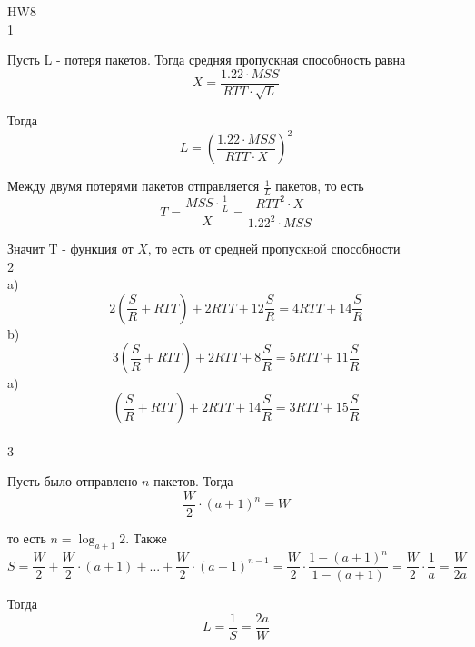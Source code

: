 \documentclass[a4paper,11pt]{article}
\begin{document}
\Large
HW8
\\
1

Пусть L - потеря пакетов. Тогда средняя пропускная способность равна
$$X = \frac{1.22 \cdot MSS}{RTT \cdot \sqrt{L}}$$

Тогда
$$L = (\frac{1.22 \cdot MSS}{RTT \cdot X})^2$$

Между двумя потерями пакетов отправляется $\frac{1}{L}$ пакетов, то есть 
$$T = \frac{MSS \cdot \frac{1}{L}}{X}  = \frac{RTT^2 \cdot X}{1.22^2 \cdot MSS}$$

Значит T - функция от $X$, то есть от средней пропускной способности
\\
2
\\
a) $$2(\frac{S}{R} + RTT) + 2RTT + 12\frac{S}{R} = 4RTT + 14\frac{S}{R}$$
b) $$3(\frac{S}{R} + RTT) + 2RTT + 8\frac{S}{R}  = 5RTT + 11\frac{S}{R}$$
a) $$(\frac{S}{R} + RTT) + 2RTT + 14\frac{S}{R} = 3RTT + 15\frac{S}{R}$$
\\
3

Пусть было отправлено $n$ пакетов. Тогда $$\frac{W}{2} \cdot (a + 1)^n = W$$ 

то есть $n = \log_{a + 1}2$. Также 
$$S = \frac{W}{2} + \frac{W}{2} \cdot (a + 1) + ... + \frac{W}{2} \cdot (a + 1)^{n - 1} = \frac{W}{2} \cdot \frac{1 - (a + 1)^n}{1 - (a + 1)} = \frac{W}{2} \cdot \frac{1}{a} = \frac{W}{2a}$$

Тогда $$L = \frac{1}{S} = \frac{2a}{W}$$
\end{document}
